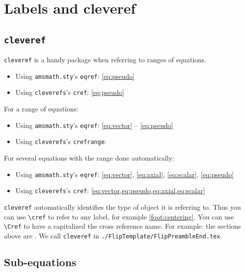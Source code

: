 \section{Labels and cleveref}
\label{sec:labels:and:cleveref}

\subsection{\texorpdfstring{\texttt{cleveref}}{cleveref}}
\label{sec:cleveref}

\texttt{cleveref} is a handy package when referring to ranges of equations. 

\begin{itemize}
	\item Using \texttt{amsmath.sty}'s \texttt{eqref}: \eqref{eq:pseudo}
	\item Using \texttt{cleverefs}'s \texttt{cref}: \cref{eq:pseudo}
\end{itemize}

For a range of equations:
\begin{itemize}
	\item Using \texttt{amsmath.sty}'s \texttt{eqref}: \eqref{eq:vector} -- \eqref{eq:pseudo}
	\item Using \texttt{cleverefs}'s \texttt{crefrange}: 
\end{itemize}

For several equations with the range done automatically:
\begin{itemize}
	\item Using \texttt{amsmath.sty}'s \texttt{eqref}: \eqref{eq:vector}, \eqref{eq:axial}, \eqref{eq:scalar}, \eqref{eq:pseudo}
	\item Using \texttt{cleverefs}'s \texttt{cref}: \cref{eq:vector,eq:pseudo,eq:axial,eq:scalar}
\end{itemize}

\texttt{cleveref} automatically identifies the type of object it is referring to. Thus you can use \verb!\cref! to refer to any label, for example \cref{foot:centering}. You can use \verb!\Cref! to have a capitalized the cross reference name. For example: the sections above are . We call \texttt{cleveref} in \texttt{./FlipTemplate/FlipPreambleEnd.tex}.


\subsection{Sub-equations}

